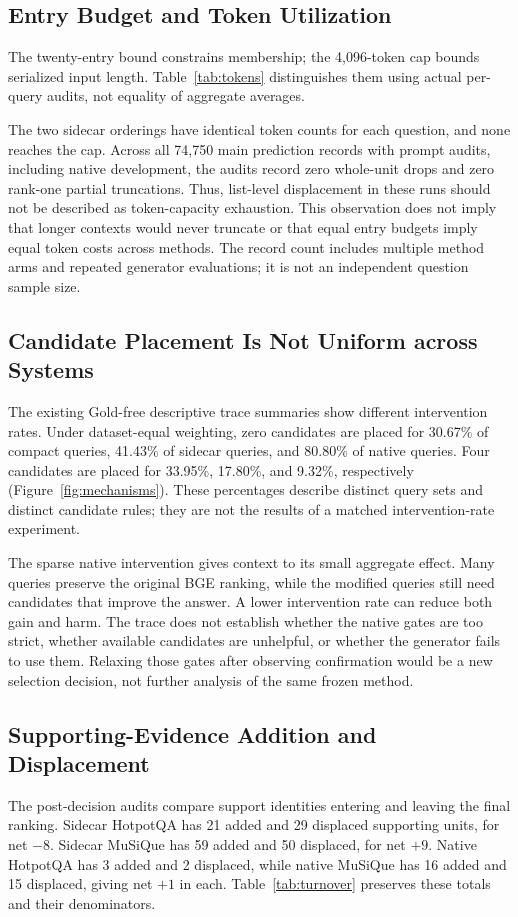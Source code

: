 \documentclass[11pt,a4paper]{article}
\begin{document}
\subsection{Entry Budget and Token Utilization}
The twenty-entry bound constrains membership; the 4,096-token cap bounds
serialized input length. Table~\ref{tab:tokens} distinguishes them using
actual per-query audits, not equality of aggregate averages.

The two sidecar orderings have identical token counts for each question, and
none reaches the cap. Across all 74,750 main prediction records with prompt
audits, including native development, the audits record zero
whole-unit drops and zero rank-one partial truncations. Thus, list-level
displacement in these runs should not be described as token-capacity
exhaustion. This observation does not imply that longer contexts would never
truncate or that equal entry budgets imply equal token costs across methods.
The record count includes multiple method arms and repeated generator
evaluations; it is not an independent question sample size.

\subsection{Candidate Placement Is Not Uniform across Systems}
The existing Gold-free descriptive trace summaries show different intervention
rates. Under dataset-equal weighting, zero candidates are placed for 30.67\%
of compact queries, 41.43\% of sidecar queries, and 80.80\% of native queries.
Four candidates are placed for 33.95\%, 17.80\%, and 9.32\%, respectively
(Figure~\ref{fig:mechanisms}). These percentages describe distinct query sets
and distinct candidate rules; they are not the results of a matched
intervention-rate experiment.

The sparse native intervention gives context to its small aggregate effect.
Many queries preserve the original BGE ranking, while the modified queries
still need candidates that improve the answer. A lower intervention rate can
reduce both gain and harm. The trace does not establish whether the native
gates are too strict, whether available candidates are unhelpful, or whether
the generator fails to use them. Relaxing those gates after observing
confirmation would be a new selection decision, not further analysis of the
same frozen method.

\subsection{Supporting-Evidence Addition and Displacement}
The post-decision audits compare support identities entering and leaving
the final ranking. Sidecar HotpotQA has 21 added and 29 displaced supporting
units, for net $-8$. Sidecar MuSiQue has 59 added and 50 displaced,
for net $+9$. Native HotpotQA has 3 added and 2 displaced, while native
MuSiQue has 16 added and 15 displaced, giving net $+1$ in each.
Table~\ref{tab:turnover} preserves these totals and their denominators.
\end{document}
